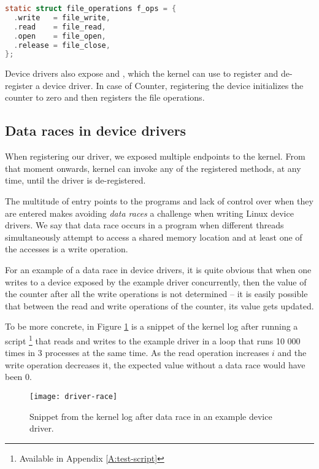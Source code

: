 \documentclass[..thesis.tex]{subfiles}
\begin{document}
\begin{lstlisting}[language=c,style=def]
static struct file_operations f_ops = {
  .write   = file_write,
  .read    = file_read,
  .open    = file_open,
  .release = file_close,
};
\end{lstlisting}

Device drivers also expose  and , which the kernel can use to register and de-register a device driver. In case of Counter,
registering the device initializes the counter  to zero and then registers the file operations. 

\subsection{Data races in device drivers}

When registering our driver, we exposed multiple endpoints to the kernel. From that moment onwards, kernel can invoke any of the registered methods,
at any time, until the driver is de-registered. 


The multitude of entry points to the programs and lack of control over when they are entered makes avoiding \textit{data races} a challenge when writing Linux device drivers.
We say that data race occurs in a program when different threads simultaneously attempt to access a shared memory location and at least one of the accesses is a
write operation.

For an example of a data race in device drivers, it is quite obvious that when one writes to a device exposed by the example driver concurrently,
then the value of the counter after all the write operations is not determined -- it is easily possible that between the read and write operations of the counter, its value gets updated.

To be more concrete, in Figure \ref{fig:driver-race} is a snippet of the kernel log after running a script \footnote{Available in Appendix \ref{A:test-script}}
that reads and writes to the example driver in a loop that runs 10 000 times in 3 processes at the same time.
As the read operation increases $i$ and the write operation decreases it, the expected value without a data race would have been $0$.


\begin{figure}[H]
\centering
\texttt{[image: driver-race]}
\caption{Snippet from the kernel log after data race in an example device driver.}
\label{fig:driver-race}
\end{figure}
\end{document}
